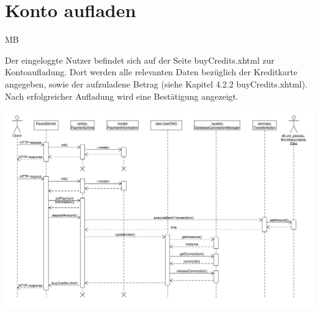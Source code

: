 \section{Konto aufladen}

\begin{tiny}
MB
\end{tiny}

Der eingeloggte Nutzer befindet sich auf der Seite \glqq buyCredits.xhtml\grqq{} zur Kontoaufladung. Dort werden alle relevanten Daten bezüglich der Kreditkarte angegeben, sowie der aufzuladene Betrag (siehe Kapitel 4.2.2 \glqq buyCredits.xhtml\grqq{}). Nach erfolgreicher Aufladung wird eine Bestätigung angezeigt.

\includegraphics[scale=0.45]{./Grafiken/Sequenzdiagramm-KontoAufladung.pdf}